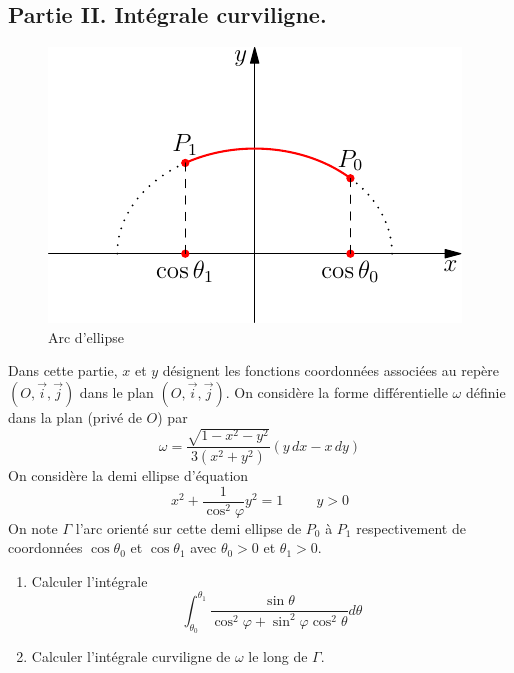 \subsection*{Partie II. Intégrale curviligne.}
\begin{figure}[h!t]
 \centering
 \includegraphics{./Eintcurv_3.pdf}
 \caption{Arc d'ellipse}
 \label{fig:Eintcurv_3}
\end{figure}
Dans cette partie, $x$ et $y$ désignent les fonctions coordonnées associées au repère $(O,\overrightarrow{i},\overrightarrow{j})$ dans le plan $(O,\overrightarrow{i},\overrightarrow{j})$.\newline
On considère la forme différentielle $\omega$ définie dans la plan (privé de $O$) par
\begin{displaymath}
 \omega = \frac{\sqrt{1-x^2-y^2}}{3(x^2+y^2)}\left(y\,dx - x\,dy \right) 
\end{displaymath}
On considère la demi ellipse d'équation
\begin{displaymath}
 x^2 + \frac{1}{\cos^2 \varphi}y^2 = 1 \hspace{1cm} y > 0
\end{displaymath}
On note $\Gamma$ l'arc orienté sur cette demi ellipse de $P_0$ à $P_1$ respectivement de coordonnées $\cos \theta_0$ et $\cos \theta_1$ avec $\theta_0>0$ et $\theta_1>0$.
\begin{enumerate}
 \item Calculer l'intégrale
\begin{displaymath}
 \int_{\theta_0}^{\theta_1}\frac{\sin \theta}{\cos^2 \varphi +\sin^2\varphi \cos^2\theta}d\theta
\end{displaymath}
\item Calculer l'intégrale curviligne de $\omega$ le long de $\Gamma$.
\end{enumerate}

